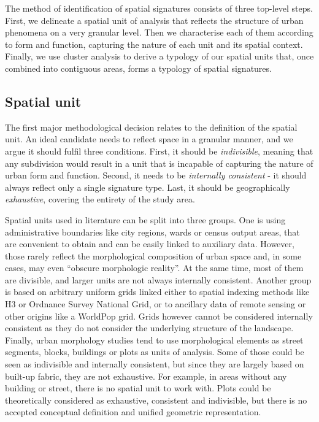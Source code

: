 The method of identification of spatial signatures consists of three top-level steps.
First, we delineate a spatial unit of analysis that reflects the structure of
urban phenomena on a very granular level. Then we characterise each of them
according to form and function, capturing the nature of each unit and its spatial
context. Finally, we use cluster analysis to derive a typology of our spatial units
that, once combined into contiguous areas, forms a typology of spatial signatures.

\subsection*{Spatial unit}
The first major methodological decision relates to the definition of the
spatial unit. An ideal candidate needs to reflect space in a granular manner, and we argue
it should fulfil three conditions. First, it should be \textit{indivisible},
meaning that any subdivision would result in a unit that is incapable of
capturing the nature of urban form and function. Second, it needs to be
\textit{internally consistent} - it should always reflect only a single signature type.
Last, it should be geographically \textit{exhaustive}, covering the entirety of the study
area.

Spatial units used in literature can be split into three groups. One is using
administrative boundaries like city regions\cite{angel2020}, wards or census output areas\cite{alexiou2016}, that are
convenient to obtain and can be easily linked to auxiliary data. However,
those rarely reflect the morphological composition of urban space and, in some cases, may
even “obscure morphologic reality”\cite{taubenbock2019new}. At the same time, most of them
are divisible, and larger units are not always internally consistent. Another group is based on
arbitrary uniform grids linked either to spatial indexing methods like
H3\cite{brodsky2018h3} or Ordnance Survey
National Grid, or to ancillary data of remote sensing or other origins like a
WorldPop grid\cite{jochem2021tools}. Grids however cannot be considered internally
consistent as
they do not consider the underlying structure of the landscape.
Finally, urban morphology studies tend to use morphological elements as
street segments\cite{araldi2019}, blocks\cite{gil2012},
buildings\cite{hamaina2012a} or plots\cite{bobkova2019} as units of analysis.
Some of those
could be seen as indivisible and internally consistent, but since they are largely based
on built-up fabric, they are not exhaustive. For example, in areas without any building or
street, there
is no spatial unit to work with. Plots could be theoretically considered as exhaustive,
consistent and indivisible, but there is no accepted conceptual definition and unified
geometric representation\cite{kropf2018}.

